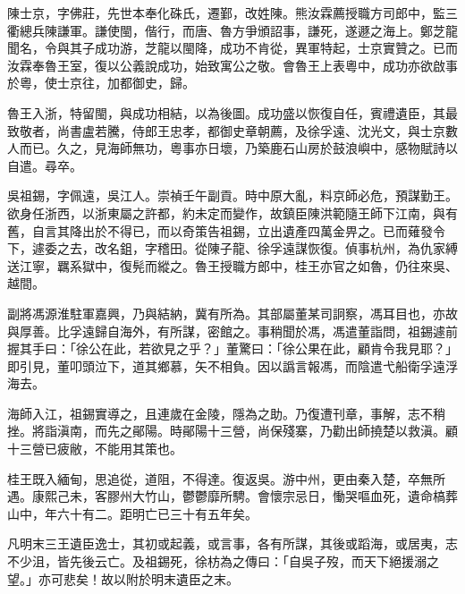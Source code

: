 \begin{pinyinscope}
陳士京，字佛莊，先世本奉化硃氏，遷鄞，改姓陳。熊汝霖薦授職方司郎中，監三衢總兵陳謙軍。謙使閩，偕行，而唐、魯方爭頒詔事，謙死，遂遯之海上。鄭芝龍聞名，令與其子成功游，芝龍以閩降，成功不肯從，異軍特起，士京實贊之。已而汝霖奉魯王室，復以公義說成功，始致寓公之敬。會魯王上表粵中，成功亦欲啟事於粵，使士京往，加都御史，歸。

魯王入浙，特留閩，與成功相結，以為後圖。成功盛以恢復自任，賓禮遺臣，其最致敬者，尚書盧若騰，侍郎王忠孝，都御史章朝薦，及徐孚遠、沈光文，與士京數人而已。久之，見海師無功，粵事亦日壞，乃築鹿石山房於鼓浪嶼中，感物賦詩以自遣。尋卒。

吳祖錫，字佩遠，吳江人。崇禎壬午副貢。時中原大亂，料京師必危，預謀勤王。欲身任浙西，以浙東屬之許都，約未定而變作，故鎮臣陳洪範隨王師下江南，與有舊，自言其降出於不得已，而以奇策告祖錫，立出遺產四萬金畀之。已而薙發令下，遽委之去，改名鉏，字稽田。從陳子龍、徐孚遠謀恢復。偵事杭州，為仇家縛送江寧，羈系獄中，復髡而縱之。魯王授職方郎中，桂王亦官之如魯，仍往來吳、越間。

副將馮源淮駐軍嘉興，乃與結納，冀有所為。其部屬董某司詗察，馮耳目也，亦故與厚善。比孚遠歸自海外，有所謀，密館之。事稍聞於馮，馮遣董詣問，祖錫遽前握其手曰：「徐公在此，若欲見之乎？」董驚曰：「徐公果在此，顧肯令我見耶？」即引見，董叩頭泣下，道其鄉慕，矢不相負。因以譌言報馮，而陰遣弋船衛孚遠浮海去。

海師入江，祖錫實導之，且連歲在金陵，隱為之助。乃復遭刊章，事解，志不稍挫。將詣滇南，而先之鄖陽。時鄖陽十三營，尚保殘寨，乃勸出師撓楚以救滇。顧十三營已疲敝，不能用其策也。

桂王既入緬甸，思追從，道阻，不得達。復返吳。游中州，更由秦入楚，卒無所遇。康熙己未，客膠州大竹山，鬱鬱靡所騁。會懷宗忌日，慟哭嘔血死，遺命槁葬山中，年六十有二。距明亡已三十有五年矣。

凡明末三王遺臣逸士，其初或起義，或言事，各有所謀，其後或蹈海，或居夷，志不少沮，皆先後云亡。及祖錫死，徐枋為之傳曰：「自吳子歿，而天下絕援溺之望。」亦可悲矣！故以附於明末遺臣之末。


\end{pinyinscope}
